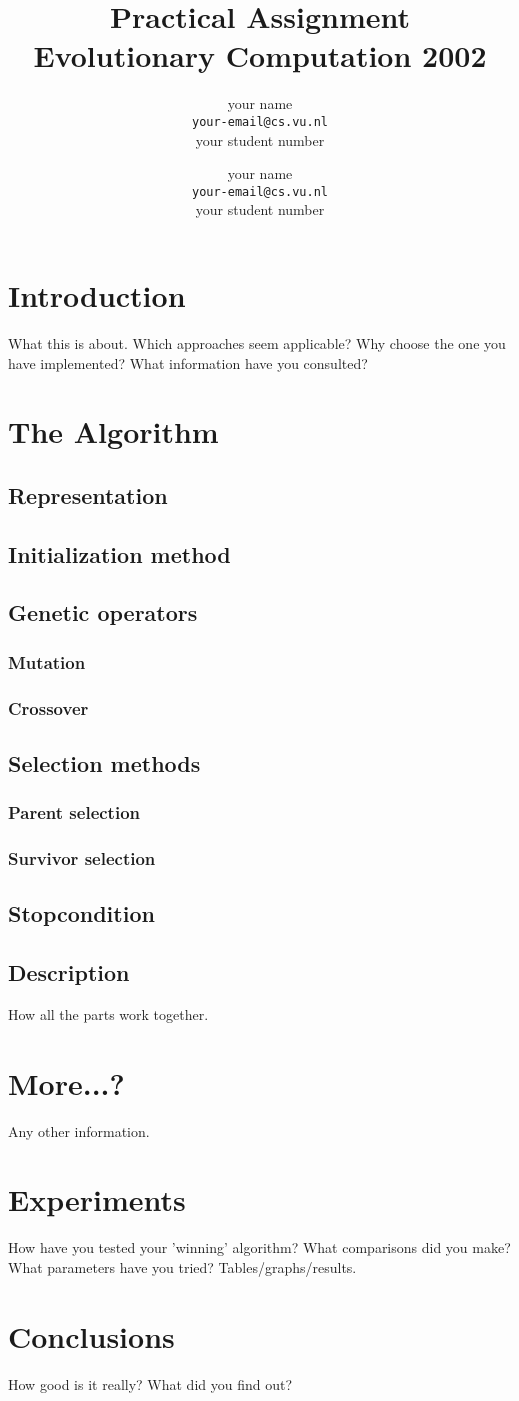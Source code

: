 \documentclass{article}
\title{Practical Assignment\\ Evolutionary Computation 2002}
\author{
your name\\
{\tt your-email@cs.vu.nl}\\
your student number
\and
your name\\
{\tt your-email@cs.vu.nl}\\
your student number
}
\begin{document}
\maketitle

\section{Introduction}
What this is about.
Which approaches seem applicable?
Why choose the one you have implemented?
What information have you consulted?

\section{The Algorithm}
\subsection{Representation}
\subsection{Initialization method}
\subsection{Genetic operators}
\subsubsection{Mutation}
\subsubsection{Crossover}
\subsection{Selection methods}
\subsubsection{Parent selection}
\subsubsection{Survivor selection}
\subsection{Stopcondition}
\subsection{Description}
How all the parts work together.

\section{More...?}
Any other information.

\section{Experiments}
How have you tested your 'winning' algorithm?
What comparisons did you make? 
What parameters have you tried?
Tables/graphs/results.

\section{Conclusions}
How good is it really? What did you find out?
\end{document}

